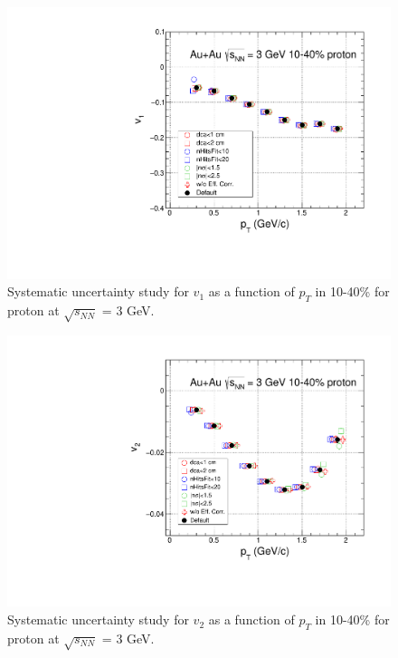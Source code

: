 \begin{figure}[h]
\includegraphics[scale=0.5]{FXT3gev/chapter3/fig/sys/proton/v1pt_proton_sys.pdf}
\caption{Systematic uncertainty study for $v_{1}$ as a function of $p_{T}$ in 10-40\% for proton at $\sqrt{s_{NN}}$ = 3 GeV. }
\label{fig:proton_v1pt_sys}
\end{figure}

\begin{figure}[h]
\includegraphics[scale=0.5]{FXT3gev/chapter3/fig/sys/proton/v2pt_proton_sys.pdf}
\caption{Systematic uncertainty study for $v_{2}$ as a function of $p_{T}$ in 10-40\% for proton at $\sqrt{s_{NN}}$ = 3 GeV. }
\label{fig:proton_v2pt_sys}
\end{figure}


















